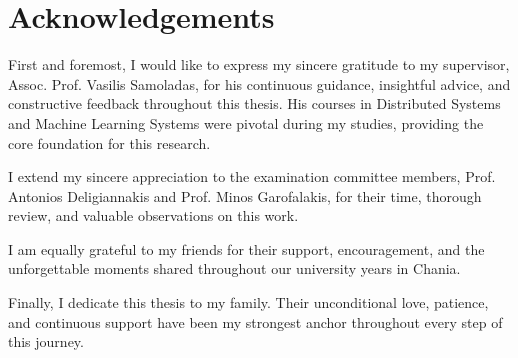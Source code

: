 \chapter*{Acknowledgements}

\vspace{0.3cm}

First and foremost, I would like to express my sincere gratitude to my supervisor, Assoc. Prof. Vasilis Samoladas, for his continuous guidance, insightful advice, and constructive feedback throughout this thesis. His courses in Distributed Systems and Machine Learning Systems were pivotal during my studies, providing the core foundation for this research.

I extend my sincere appreciation to the examination committee members, Prof. Antonios Deligiannakis and Prof. Minos Garofalakis, for their time, thorough review, and valuable observations on this work.

I am equally grateful to my friends for their support, encouragement, and the unforgettable moments shared throughout our university years in Chania.

Finally, I dedicate this thesis to my family. Their unconditional love, patience, and continuous support have been my strongest anchor throughout every step of this journey.


